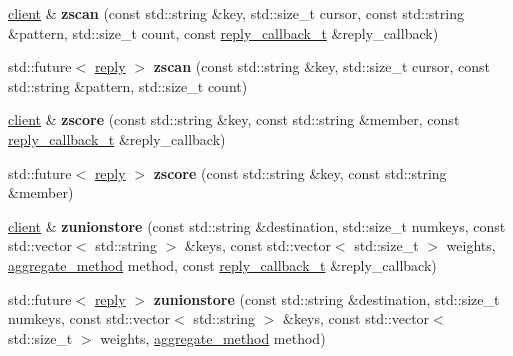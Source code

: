 \begin{DoxyCompactItemize}
\item 
\mbox{\label{classcpp__redis_1_1client_af9c9fd63e09c0dce9ee8a5a6263ac990}} 
\hyperlink{classcpp__redis_1_1client}{client} \& {\bfseries zscan} (const std\+::string \&key, std\+::size\+\_\+t cursor, const std\+::string \&pattern, std\+::size\+\_\+t count, const \hyperlink{classcpp__redis_1_1client_a061a1140d36d2eaeda82b09a0bb3f9f2}{reply\+\_\+callback\+\_\+t} \&reply\+\_\+callback)
\item 
\mbox{\label{classcpp__redis_1_1client_a21a9678e93ec0ae43fd0079391696964}} 
std\+::future$<$ \hyperlink{classcpp__redis_1_1reply}{reply} $>$ {\bfseries zscan} (const std\+::string \&key, std\+::size\+\_\+t cursor, const std\+::string \&pattern, std\+::size\+\_\+t count)
\item 
\mbox{\label{classcpp__redis_1_1client_a5e0a18243dee60595c82fc4a630f6d86}} 
\hyperlink{classcpp__redis_1_1client}{client} \& {\bfseries zscore} (const std\+::string \&key, const std\+::string \&member, const \hyperlink{classcpp__redis_1_1client_a061a1140d36d2eaeda82b09a0bb3f9f2}{reply\+\_\+callback\+\_\+t} \&reply\+\_\+callback)
\item 
\mbox{\label{classcpp__redis_1_1client_a72b20e861696db3e4dd5a4af96a1b427}} 
std\+::future$<$ \hyperlink{classcpp__redis_1_1reply}{reply} $>$ {\bfseries zscore} (const std\+::string \&key, const std\+::string \&member)
\item 
\mbox{\label{classcpp__redis_1_1client_aa00f49f4e82e6d9b157ffc5f5f23a9b4}} 
\hyperlink{classcpp__redis_1_1client}{client} \& {\bfseries zunionstore} (const std\+::string \&destination, std\+::size\+\_\+t numkeys, const std\+::vector$<$ std\+::string $>$ \&keys, const std\+::vector$<$ std\+::size\+\_\+t $>$ weights, \hyperlink{classcpp__redis_1_1client_aa197ca5b36da793c701d3ba388ec4946}{aggregate\+\_\+method} method, const \hyperlink{classcpp__redis_1_1client_a061a1140d36d2eaeda82b09a0bb3f9f2}{reply\+\_\+callback\+\_\+t} \&reply\+\_\+callback)
\item 
\mbox{\label{classcpp__redis_1_1client_a6093c179d0aa6e53d7b7fa234782f140}} 
std\+::future$<$ \hyperlink{classcpp__redis_1_1reply}{reply} $>$ {\bfseries zunionstore} (const std\+::string \&destination, std\+::size\+\_\+t numkeys, const std\+::vector$<$ std\+::string $>$ \&keys, const std\+::vector$<$ std\+::size\+\_\+t $>$ weights, \hyperlink{classcpp__redis_1_1client_aa197ca5b36da793c701d3ba388ec4946}{aggregate\+\_\+method} method)

\end{DoxyCompactItemize}
